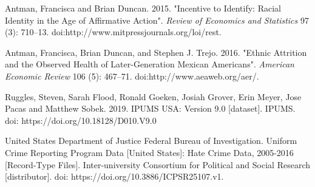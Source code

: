 \documentclass{article}
\begin{document}
\newpage
\begin{thebibliography}{9}
    Antman, Francisca and Brian Duncan. 
    2015.
    "Incentive to Identify: Racial Identity in the Age of Affirmative Action". 
    \textit{Review of Economics and Statistics} 97 (3): 710–13. doi:http://www.mitpressjournals.org/loi/rest.

    Antman, Francisca, Brian Duncan, and Stephen J. Trejo. 
    2016.
    "Ethnic Attrition and the Observed Health of Later-Generation Mexican Americans". 
    \textit{American Economic Review} 106 (5): 467–71. doi:http://www.aeaweb.org/aer/.

    Ruggles, Steven, Sarah Flood, Ronald Goeken, Josiah Grover, Erin Meyer, Jose Pacas and Matthew Sobek. 2019. 
    IPUMS USA: Version 9.0 [dataset]. 
    IPUMS.
    doi: https://doi.org/10.18128/D010.V9.0
    
    United States Department of Justice Federal Bureau of Investigation. 
    Uniform Crime Reporting Program Data [United States]: Hate Crime Data, 2005-2016 [Record-Type Files]. 
    Inter-university Consortium for Political and Social Research [distributor].
    doi: https://doi.org/10.3886/ICPSR25107.v1.

\end{thebibliography}
\end{document}
